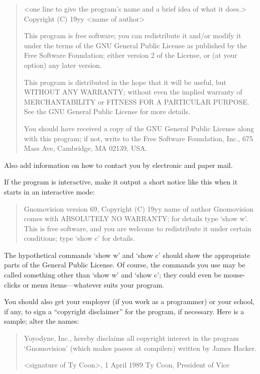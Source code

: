 \documentclass[%
	11pt,
        a4paper,
        twoside]{workrep}
\newcommand{\dash}{---}
\begin{document}
\begin{quote}\ttfamily\raggedright
    <one line to give the program's name and a brief idea of what it does.>
    Copyright (C) 19yy  <name of author>

    This program is free software; you can redistribute it and/or modify
    it under the terms of the GNU General Public License as published by
    the Free Software Foundation; either version 2 of the License, or
    (at your option) any later version.

    This program is distributed in the hope that it will be useful,
    but WITHOUT ANY WARRANTY; without even the implied warranty of
    MERCHANTABILITY or FITNESS FOR A PARTICULAR PURPOSE.  See the
    GNU General Public License for more details.

    You should have received a copy of the GNU General Public License
    along with this program; if not, write to the Free Software
    Foundation, Inc., 675 Mass Ave, Cambridge, MA 02139, USA.
\end{quote}

Also add information on how to contact you by electronic and paper mail.

If the program is interactive, make it output a short notice like this
when it starts in an interactive mode:

\begin{quote}\ttfamily\raggedright
    Gnomovision version 69, Copyright (C) 19yy name of author
    Gnomovision comes with ABSOLUTELY NO WARRANTY; for details type `show w'.
    This is free software, and you are welcome to redistribute it
    under certain conditions; type `show c' for details.
\end{quote}

The hypothetical commands `show w' and `show c' should show the appropriate
parts of the General Public License.  Of course, the commands you use may
be called something other than `show w' and `show c'; they could even be
mouse-clicks or menu items\dash whatever suits your program.

You should also get your employer (if you work as a programmer) or your
school, if any, to sign a ``copyright disclaimer'' for the program, if
necessary.  Here is a sample; alter the names:

\begin{quote}\ttfamily\raggedright
  Yoyodyne, Inc., hereby disclaims all copyright interest in the program
  `Gnomovision' (which makes passes at compilers) written by James Hacker.

  <signature of Ty Coon>, 1 April 1989
  Ty Coon, President of Vice
\end{quote}
\end{document}
